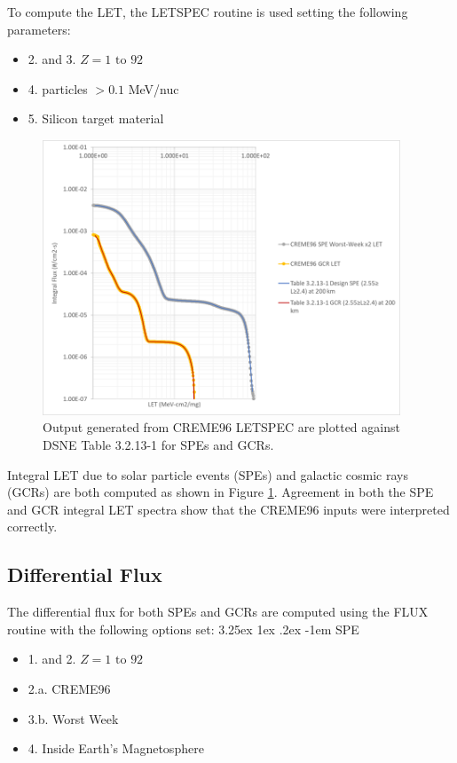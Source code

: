 \documentclass{hitec}
\makeatletter
\renewcommand\paragraph{\@startsection{paragraph}{5}{\z@}%
	{3.25ex \@plus1ex \@minus.2ex}%
	{-1em}%
	{\normalfont\normalsize\bfseries}}
\makeatother
\begin{document}
To compute the LET, the \textsf{LETSPEC} routine is used setting the following parameters:
\begin{itemize}
	\item 2. and 3. $Z = 1 \text{ to } 92$
	\item 4. particles $> 0.1 $ MeV/nuc
	\item 5. Silicon target material
\end{itemize}
\begin{figure}[htbp!]
	\centering
	\includegraphics[width=0.95\textwidth]{DSNE_LET_Comparison.png}
	\caption{Output generated from CREME96 \textsf{LETSPEC} are plotted against DSNE Table 3.2.13-1 for SPEs and GCRs.}\label{fig:DSNE_LET_Comparison}
\end{figure}

Integral LET due to solar particle events (SPEs) and galactic cosmic rays (GCRs) are both computed as shown in Figure \ref{fig:DSNE_LET_Comparison}. Agreement in both the SPE and GCR integral LET spectra show that the CREME96 inputs were interpreted correctly.


\clearpage %

\subsection{Differential Flux}\label{ssec:DifferentialFlux}

The differential flux for both SPEs and GCRs are computed using the \textsf{FLUX} routine with the following options set:
\paragraph{SPE}
\begin{itemize}
	\item 1. and 2. $Z = 1 \text{ to } 92$
	\item 2.a. CREME96
	\item 3.b. Worst Week
	\item 4. Inside Earth's Magnetosphere
\end{itemize}
\end{document}

